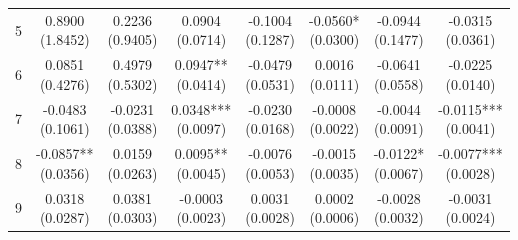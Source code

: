 \begin{table}[!htbp]
\begin{threeparttable}
\begin{subtable}[t]{\textwidth}
\begin{tabular}{@{}lccccccc@{}}
5 & \shortstack{0.8900\\(1.8452)} & \shortstack{0.2236\\(0.9405)} & \shortstack{0.0904\\(0.0714)} & \shortstack{-0.1004\\(0.1287)} & \shortstack{-0.0560*\\(0.0300)} & \shortstack{-0.0944\\(0.1477)} & \shortstack{-0.0315\\(0.0361)} \\
6 & \shortstack{0.0851\\(0.4276)} & \shortstack{0.4979\\(0.5302)} & \shortstack{0.0947**\\(0.0414)} & \shortstack{-0.0479\\(0.0531)} & \shortstack{0.0016\\(0.0111)} & \shortstack{-0.0641\\(0.0558)} & \shortstack{-0.0225\\(0.0140)} \\
7 & \shortstack{-0.0483\\(0.1061)} & \shortstack{-0.0231\\(0.0388)} & \shortstack{0.0348***\\(0.0097)} & \shortstack{-0.0230\\(0.0168)} & \shortstack{-0.0008\\(0.0022)} & \shortstack{-0.0044\\(0.0091)} & \shortstack{-0.0115***\\(0.0041)} \\
8 & \shortstack{-0.0857**\\(0.0356)} & \shortstack{0.0159\\(0.0263)} & \shortstack{0.0095**\\(0.0045)} & \shortstack{-0.0076\\(0.0053)} & \shortstack{-0.0015\\(0.0035)} & \shortstack{-0.0122*\\(0.0067)} & \shortstack{-0.0077***\\(0.0028)} \\
9 & \shortstack{0.0318\\(0.0287)} & \shortstack{0.0381\\(0.0303)} & \shortstack{-0.0003\\(0.0023)} & \shortstack{0.0031\\(0.0028)} & \shortstack{0.0002\\(0.0006)} & \shortstack{-0.0028\\(0.0032)} & \shortstack{-0.0031\\(0.0024)} \\

\end{tabular}
\end{subtable}
\end{threeparttable}
\end{table}
